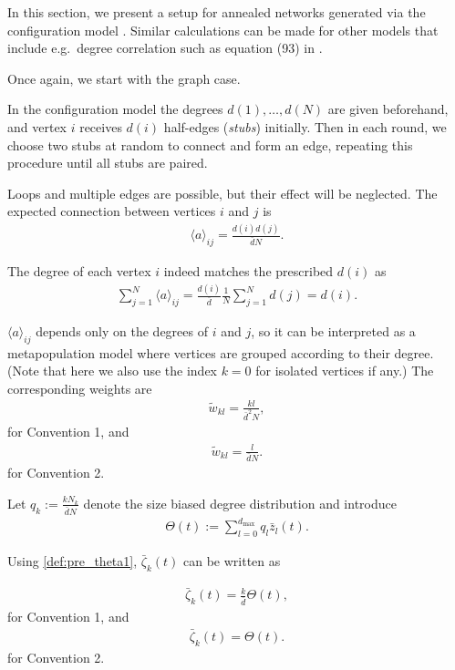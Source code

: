 \documentclass{article}
\newcommand{\1}[1]{{\mathds{1}}_{\left\{#1\right\}}}
\begin{document}
	In this section, we present a setup for annealed networks generated via the configuration model \cite{configuration}. Similar calculations can be made for other models that include e.g.\ degree correlation  such as equation (93) in \cite{annealed_formula}.
	
	Once again, we start with the graph case.
	
	In the configuration model the degrees $d(1), \dots, d(N)$ are given beforehand, and vertex $i$ receives $d(i)$ half-edges (\emph{stubs}) initially. Then in each round, we choose two stubs at random to connect and form an edge, repeating this procedure until all stubs are paired.
	
	Loops and multiple edges are possible, but their effect will be neglected. The expected connection between vertices $i$ and $j$ is
	\begin{align*}
		\langle a \rangle_{ij}=\frac{d(i)d(j)}{\bar{d}N}.
	\end{align*}
	
	The degree of each vertex $i$ indeed matches the prescribed $d(i)$ as
	\begin{align*}
		\sum_{j=1}^N \langle a \rangle_{ij}=\frac{d(i)}{\bar{d}} \frac{1}{N}\sum_{j=1}^N d(j)=d(i).
	\end{align*}
	
	$\langle a \rangle_{ij}$ depends only on the degrees of $i$ and $j$, so it can be interpreted as a metapopulation model where vertices are grouped according to their degree. (Note that here we also use the index $k=0$ for isolated vertices if any.) The corresponding weights are
	\begin{align*}
		\tilde{w}_{kl}=\frac{kl}{\bar{d}^2 N},
	\end{align*}
	for Convention 1, and 
	\begin{align*}
		\tilde{w}_{kl}=\frac{l}{\bar{d}N}.
	\end{align*}
	for Convention 2.
	
	Let $q_k:= \frac{k N_k}{\bar{d} N}$ denote the size biased degree distribution and introduce
	\begin{align}
		\label{def:theta1}
		\Theta(t):=\sum_{l=0}^{d_{\max}} q_{l}\bar{z}_{l}(t).
	\end{align}
	
	Using \eqref{def:pre_theta1}, $\bar{\zeta}_k(t)$ can be written as
	
	\begin{align*}
		\bar{\zeta}_k(t)= \frac{k}{\bar{d}} \Theta(t),
	\end{align*}
	for Convention 1, and 
	\begin{align*}
		\bar{\zeta}_k(t)=  \Theta(t).
	\end{align*}
	for Convention 2.
	
\end{document}
